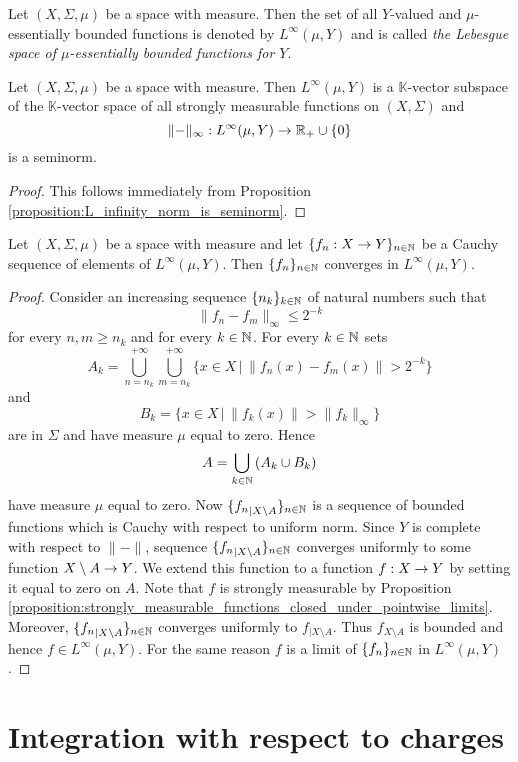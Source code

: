 \begin{definition}
    Let $(X,\Sigma,\mu)$ be a space with measure. Then the set of all $Y$-valued and $\mu$-essentially bounded functions is denoted by $L^{\infty}(\mu,Y)$ and is called \textit{the Lebesgue space of $\mu$-essentially bounded functions for $Y$}.
\end{definition}

\begin{corollary}\label{corollary:L_infinity_is_seminormed_topological_vector_space}
    Let $(X,\Sigma,\mu)$ be a space with measure. Then $L^{\infty}(\mu,Y)$ is a $\mathbb{K}$-vector subspace of the $\mathbb{K}$-vector space of all strongly measurable functions on $(X,\Sigma)$ and
    $$\lVert -\rVert_{\infty}:L^{\infty}(\mu,Y)\rightarrow {\mathbb R}_+\cup \{0\}$$
    is a seminorm.
\end{corollary}
\begin{proof}
    This follows immediately from Proposition \ref{proposition:L_infinity_norm_is_seminorm}.
\end{proof}

\begin{theorem}[Riesz]\label{theorem:Riesz_theorem_for_L_infinity}
    Let $(X,\Sigma,\mu)$ be a space with measure and let $\{f_n:X\rightarrow Y\}_{n\in {\mathbb N}}$ be a Cauchy sequence of elements of $L^{\infty}(\mu,Y)$. Then $\{f_n\}_{n\in {\mathbb N}}$ converges in $L^{\infty}(\mu,Y)$.
\end{theorem}
\begin{proof}
    Consider an increasing sequence $\{n_k\}_{k\in {\mathbb N}}$ of natural numbers such that
    $$\lVert f_{n} - f_{m}\rVert_{\infty} \leq 2^{-k}$$
    for every $n,m\geq n_k$ and for every $k \in {\mathbb N}$. For every $k\in {\mathbb N}$ sets
    $$A_{k} = \bigcup_{n=n_k}^{+\infty}\bigcup_{m=n_k}^{+\infty}\big\{x\in X\,\big|\,\lVert f_{n}(x) - f_{m}(x) \rVert > 2^{-k} \big\}$$
    and
    $$B_k = \big\{x\in X\,\big|\,\lVert f_k(x) \rVert > \lVert f_k \rVert_{\infty}\big\}$$
    are in $\Sigma$ and have measure $\mu$ equal to zero. Hence
    $$A = \bigcup_{k\in {\mathbb N}}\left(A_k\cup B_k\right)$$
    have measure $\mu$ equal to zero. Now $\{{f_n}_{\mid X\setminus A}\}_{n\in {\mathbb N}}$ is a sequence of bounded functions which is Cauchy with respect to uniform norm. Since $Y$ is complete with respect to $\lVert-\rVert$, sequence $\{{f_n}_{\mid X\setminus A}\}_{n\in {\mathbb N}}$ converges uniformly to some function $X\setminus A\rightarrow Y$. We extend this function to a function $f:X\rightarrow Y$ by setting it equal to zero on $A$. Note that $f$ is strongly measurable by Proposition \ref{proposition:strongly_measurable_functions_closed_under_pointwise_limits}. Moreover, $\{{f_n}_{\mid X\setminus A}\}_{n\in {\mathbb N}}$ converges uniformly to $f_{\mid X\setminus A}$. Thus $f_{X\setminus A}$ is bounded and hence $f\in L^{\infty}(\mu,Y)$. For the same reason $f$ is a limit of $\{f_n\}_{n\in {\mathbb N}}$ in $L^{\infty}(\mu,Y)$.
\end{proof}

\section{Integration with respect to charges}






\small




